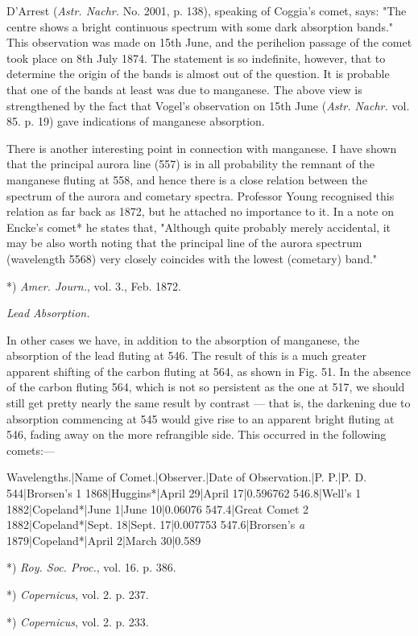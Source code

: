 \documentclass[a4paper, 12pt, oneside, polutonikogreek, english]{article}
\begin{document}
D'Arrest (\emph{Astr. Nachr.} No. 2001, p. 138), speaking of Coggia's comet, says: "The centre shows a bright continuous spectrum with some dark absorption bands." This observation was made on 15th June, and the perihelion passage of the comet took place on 8th July 1874. The statement is so indefinite, however, that to determine the origin of the bands is almost out of the question. It is probable that one of the bands at least was due to manganese. The above view is strengthened by the fact that Vogel's observation on 15th June (\emph{Astr. Nachr.} vol. 85. p. 19) gave indications of manganese absorption.

There is another interesting point in connection with manganese. I have shown that the principal aurora line (557) is in all probability the remnant of the manganese fluting at 558, and hence there is a close relation between the spectrum of the aurora and cometary spectra. Professor Young recognised this relation as far back as 1872, but he attached no importance to it. In a note on Encke's comet* he states that, "Although quite probably merely accidental, it may be also worth noting that the principal line of the aurora spectrum (wavelength 5568) very closely coincides with the lowest (cometary) band."

*) \emph{Amer. Journ.}, vol. 3., Feb. 1872.

\emph{Lead Absorption.}

In other cases we have, in addition to the absorption of manganese, the absorption of the lead fluting at 546. The result of this is a much greater apparent shifting of the carbon fluting at 564, as shown in Fig. 51. In the absence of the carbon fluting 564, which is not so persistent as the one at 517, we should still get pretty nearly the same result by contrast --- that is, the darkening due to absorption commencing at 545 would give rise to an apparent bright fluting at 546, fading away on the more refrangible side. This occurred in the following comets:---

Wavelengths.|Name of Comet.|Observer.|Date of Observation.|P. P.|P. D. 
544|Brorsen's 1 1868|Huggins*|April 29|April 17|0.596762 
546.8|Well's 1 1882|Copeland*|June 1|June 10|0.06076 
547.4|Great Comet 2 1882|Copeland*|Sept. 18|Sept. 17|0.007753 
547.6|Brorsen's \emph{a} 1879|Copeland*|April 2|March 30|0.589

*) \emph{Roy. Soc. Proc.}, vol. 16. p. 386.

*) \emph{Copernicus}, vol. 2. p. 237.

*) \emph{Copernicus}, vol. 2. p. 233.
\end{document}
